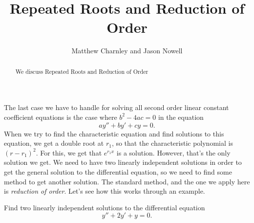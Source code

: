 \documentclass{ximera}
\title{Repeated Roots and Reduction of Order}
\author{Matthew Charnley and Jason Nowell}
\begin{document}
\begin{abstract}
    We discuss Repeated Roots and Reduction of Order
\end{abstract}
\maketitle


\label{reproots:section}



The last case we have to handle for solving all second order linear constant coefficient equations is the case where $b^2 - 4ac = 0$ in the equation
\begin{equation*}
    ay'' + by' + cy = 0.
\end{equation*}
When we try to find the characteristic equation and find solutions to this equation, we get a double root at $r_1$, so that the characteristic polynomial is $(r-r_1)^2$. For this, we get that $e^{r_1x}$ is a solution. However, that's the only solution we get. We need to have two linearly independent solutions in order to get the general solution to the differential equation, so we need to find some method to get another solution. The standard method, and the one we apply here is \emph{reduction of order}. Let's see how this works through an example.

\begin{example}
    Find two linearly independent solutions to the differential equation
    \begin{equation*}
        y'' + 2y' + y = 0.
    \end{equation*}
\end{example}
\end{document}
